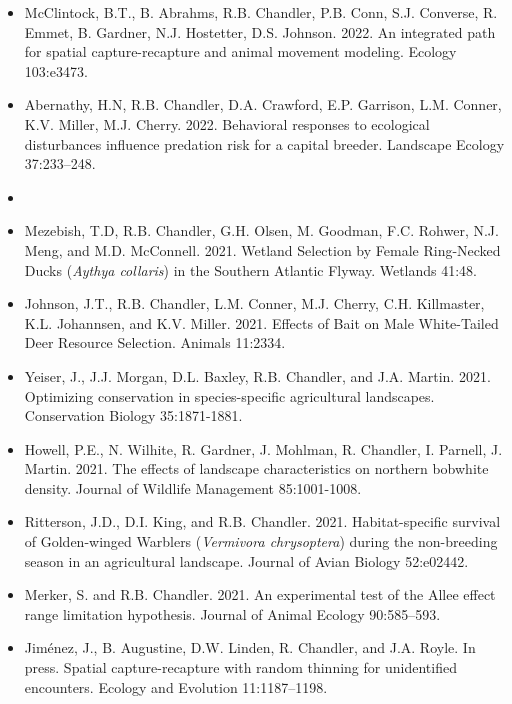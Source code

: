 \documentclass[12pt]{article}
\begin{document}
\begin{itemize}
\item McClintock, B.T., B. Abrahms, R.B. Chandler, P.B. Conn,
  S.J. Converse, R. Emmet, B. Gardner, N.J. Hostetter,
  D.S. Johnson. 2022. An integrated path for spatial
  capture-recapture and animal movement modeling. Ecology 103:e3473. 

\item Abernathy, H.N, R.B. Chandler, D.A. Crawford, E.P. Garrison,
  L.M. Conner, K.V. Miller, M.J. Cherry. 2022. Behavioral
  responses to ecological disturbances influence predation risk for a
  capital breeder. Landscape Ecology 37:233--248.

\item[] { \\}

\item Mezebish, T.D, R.B. Chandler, G.H. Olsen, M. Goodman,
  F.C. Rohwer, N.J. Meng, and M.D. McConnell. 2021. Wetland Selection
  by Female Ring-Necked Ducks ({\it Aythya collaris}) in the Southern
  Atlantic Flyway. Wetlands 41:48.

\item Johnson, J.T., R.B. Chandler, L.M. Conner, M.J. Cherry,
  C.H. Killmaster, K.L. Johannsen, and K.V. Miller. 2021. Effects of
  Bait on Male White-Tailed Deer Resource Selection. Animals 11:2334. 
  
\item Yeiser, J., J.J. Morgan, D.L. Baxley, R.B. Chandler, and
  J.A. Martin. 2021. Optimizing conservation in species-specific
  agricultural landscapes. Conservation Biology 35:1871-1881. 

\item Howell, P.E., N. Wilhite, R. Gardner, J. Mohlman, R. Chandler,
  I. Parnell, J. Martin. 2021. The effects of landscape
  characteristics on northern bobwhite density. Journal of Wildlife
  Management 85:1001-1008. 

\item Ritterson, J.D., D.I. King, and
  R.B. Chandler. 2021. Habitat-specific survival of Golden-winged
  Warblers ({\it Vermivora chrysoptera}) during the non-breeding
  season in an agricultural landscape. Journal of Avian Biology
  52:e02442.  
  
\item Merker, S. and R.B. Chandler. 2021. An experimental test of 
  the Allee effect range limitation hypothesis. Journal of Animal
  Ecology 90:585--593. 

\item Jim\'enez, J., B. Augustine, D.W. Linden, R. Chandler, and
  J.A. Royle. In press. Spatial capture-recapture with random thinning
  for unidentified encounters. Ecology and Evolution 11:1187--1198.


\end{itemize}
\end{document}
